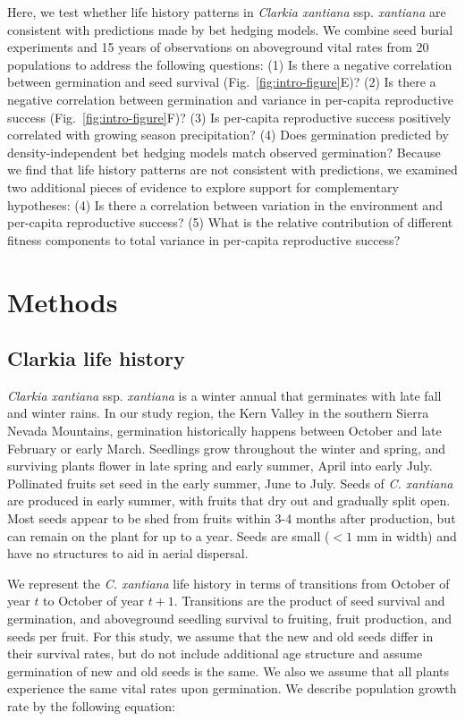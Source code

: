 \documentclass[12pt, oneside]{article}   	%
\begin{document}
Here, we test whether life history patterns in \textit{Clarkia xantiana} ssp. \textit{xantiana} are consistent with predictions made by bet hedging models. We combine seed burial experiments and 15 years of observations on aboveground vital rates from 20 populations to address the following questions: (1) Is there a negative correlation between germination and seed survival (Fig.~\ref{fig:intro-figure}E)? (2) Is there a negative correlation between germination and variance in per-capita reproductive success (Fig.~\ref{fig:intro-figure}F)? (3)  Is per-capita reproductive success positively correlated with growing season precipitation? (4) Does germination predicted by density-independent bet hedging models match observed germination? Because we find that life history patterns are not consistent with predictions, we examined two additional pieces of evidence to explore support for complementary hypotheses: (4) Is there a correlation between variation in the environment and per-capita reproductive success? (5) What is the relative contribution of different fitness components to total variance in per-capita reproductive success?

\section{Methods}

\subsection{Clarkia life history}

\textit{Clarkia xantiana} ssp. \textit{xantiana} is a winter annual that germinates with late fall and winter rains. In our study region, the Kern Valley in the southern Sierra Nevada Mountains, germination historically happens between October and late February or early March. Seedlings grow throughout the winter and spring, and surviving plants flower in late spring and early summer, April into early July. Pollinated fruits set seed in the early summer, June to July. Seeds of \textit{C. xantiana} are produced in early summer, with fruits that dry out and gradually split open. Most seeds appear to be shed from fruits within 3-4 months after production, but can remain on the plant for up to a year. Seeds are small ($<1$ mm in width) and have no structures to aid in aerial dispersal. 

We represent the \textit{C. xantiana} life history in terms of transitions from October of year $t$ to October of year $t+1$. Transitions are the product of seed survival and germination, and aboveground seedling survival to fruiting, fruit production, and seeds per fruit. For this study, we assume that the new and old seeds differ in their survival rates, but do not include additional age structure and assume germination of new and old seeds is the same. We also we assume that all plants experience the same vital rates upon germination. We describe population growth rate by the following equation:
\end{document}
